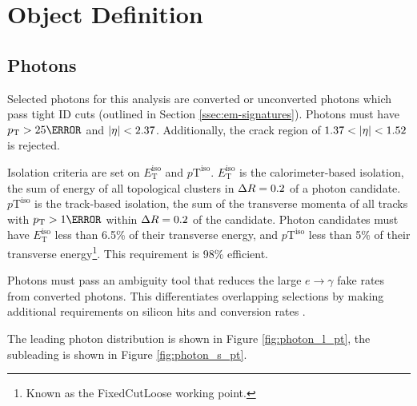 \section{Object Definition}
\subsection{Photons}

Selected photons for this analysis are converted or unconverted photons which pass tight ID cuts (outlined in Section \ref{ssec:em-signatures}). Photons must have $\pt > \unit{25}{\GeV}$ and $|\eta| < 2.37$. Additionally, the crack region of $1.37 < |\eta| < 1.52$ is rejected.

Isolation criteria are set on $E_{\text{T}}^{\text{iso}}$ and $p{\text{T}}^{\text{iso}}$. $E_{\text{T}}^{\text{iso}}$ is the calorimeter-based isolation, the sum of energy of all topological clusters in $\Delta R = 0.2$ of a photon candidate. $p{\text{T}}^{\text{iso}}$ is the track-based isolation, the sum of the transverse momenta of all tracks with $\pt > \unit{1}{\GeV}$ within $\Delta R = 0.2$ of the candidate. Photon candidates must have $E_{\text{T}}^{\text{iso}}$ less than 6.5\% of their transverse energy, and $p{\text{T}}^{\text{iso}}$ less than 5\% of their transverse energy\footnote{Known as the FixedCutLoose working point.}. This requirement is 98\% efficient. 


Photons must pass an ambiguity tool that reduces the large $e\rightarrow\gamma$ fake rates from converted photons. This differentiates overlapping selections by making additional requirements on silicon hits and conversion rates \cite{r1-photonID}.

The leading photon \pt distribution is shown in Figure \ref{fig:photon_l_pt}, the subleading is shown in Figure \ref{fig:photon_s_pt}.

